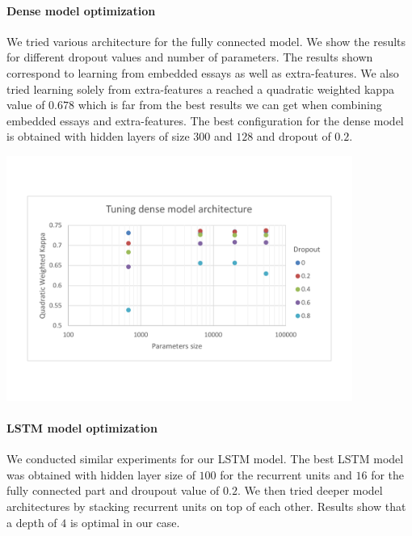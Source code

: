 \documentclass[a4paper,12pt,english]{article}
\begin{document}
\paragraph{Dense model optimization} We tried various architecture for the fully connected model. We show the results for different dropout values and number of parameters. The results shown correspond to learning from embedded essays as well as extra-features. We also tried learning solely from extra-features a reached a quadratic weighted kappa value of $0.678$ which is far from the best results we can get when combining embedded essays and extra-features. The best configuration for the dense model is obtained with hidden layers of size $300$ and $128$ and dropout of $0.2$.

\begin{center}
\vspace*{-1.5cm}
\includegraphics[width=0.85\textwidth]{fig/tune_dense_arch.pdf}
\vspace*{-1.5cm}
\end{center}

\paragraph{LSTM model optimization} We conducted similar experiments for our LSTM model. The best LSTM model was obtained with hidden layer size of $100$ for the recurrent units and $16$ for the fully connected part and droupout value of $0.2$. We then tried deeper model architectures by stacking recurrent units on top of each other. Results show that a depth of $4$ is optimal in our case.
\end{document}
